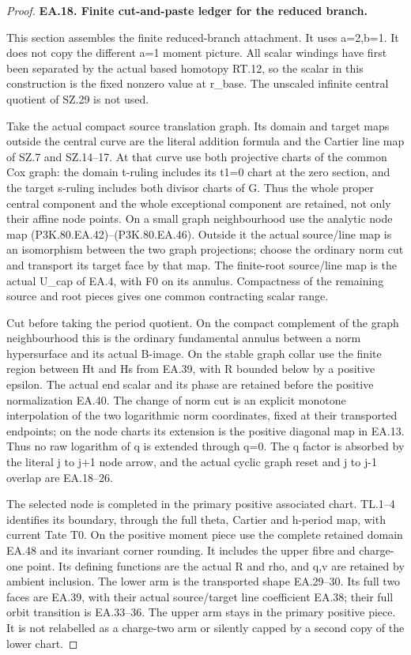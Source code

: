\begin{proof}
\par\medskip\noindent\textbf{EA.18. Finite cut-and-paste ledger for the reduced branch.}\par\nopagebreak[4]

This section assembles the finite reduced-branch attachment.
It uses a=2,b=1. It does not copy the different a=1 moment picture.
All scalar windings have first been separated by the actual based
homotopy RT.12, so the scalar in this construction is the fixed
nonzero value at r\_base. The unscaled infinite central quotient of
SZ.29 is not used.

Take the actual compact source translation graph. Its domain and
target maps outside the central curve are the literal addition
formula and the Cartier line map of SZ.7 and SZ.14--17. At that
curve use both projective charts of the common Cox graph: the
domain t-ruling includes its t1=0 chart at the zero section, and
the target s-ruling includes both divisor charts of G. Thus the
whole proper central component and the whole exceptional component
are retained, not only their affine node points. On a small graph
neighbourhood use the analytic node map (P3K.80.EA.42)--(P3K.80.EA.46). Outside
it the actual source/line map is an isomorphism between the two
graph projections; choose the ordinary norm cut and transport its
target face by that map. The finite-root source/line map is the
actual U\_cap of EA.4, with F0 on its annulus. Compactness of the
remaining source and root pieces gives one common contracting
scalar range.

Cut before taking the period quotient. On the compact complement
of the graph neighbourhood this is the ordinary fundamental
annulus between a norm hypersurface and its actual B-image. On
the stable graph collar use the finite region between Ht and Hs
from EA.39, with R bounded below by a positive epsilon. The
actual end scalar and its phase are retained before the positive
normalization EA.40. The change of norm cut is an explicit
monotone interpolation of the two logarithmic norm coordinates,
fixed at their transported endpoints; on the node charts its
extension is the positive diagonal map in EA.13. Thus no raw
logarithm of q is extended through q=0. The q factor is absorbed
by the literal j to j+1 node arrow, and the actual cyclic graph
reset and j to j-1 overlap are EA.18--26.

The selected node is completed in the primary positive associated
chart. TL.1--4 identifies its boundary, through the full theta,
Cartier and h-period map, with current Tate T0. On the positive
moment piece use the complete retained domain EA.48 and its invariant
corner rounding. It includes the upper fibre and charge-one point. Its defining functions are the actual R and
rho, and q,v are retained by ambient inclusion. The lower arm
is the transported shape EA.29--30. Its full two faces are
EA.39, with their actual source/target line coefficient EA.38;
their full orbit transition is EA.33--36. The upper arm stays
in the primary positive piece. It is not relabelled as a
charge-two arm or silently capped by a second copy of the
lower chart.


\end{proof}
